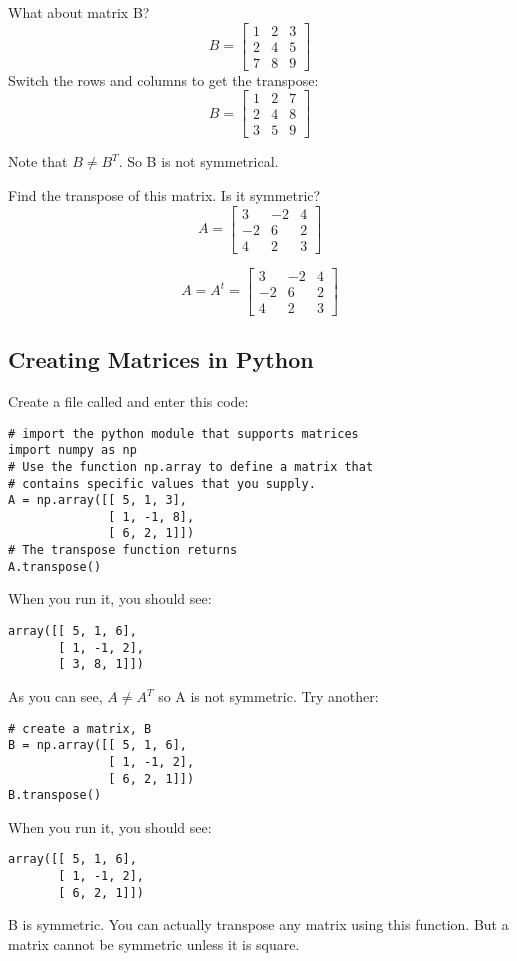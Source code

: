 What about matrix B? 
$$
B = \begin{bmatrix}
1 & 2 & 3 \\
2 & 4 & 5 \\
7 & 8 & 9
\end{bmatrix}
$$
Switch the rows and columns to get the transpose:
$$
B = \begin{bmatrix}
1 & 2 & 7 \\
2 & 4 & 8 \\
3 & 5 & 9
\end{bmatrix}
$$

Note that $B \neq B^T$. So B is not symmetrical.

\begin{Exercise}[title={Matrix Transposition}, label=matrix-transpose01]
Find the transpose of this matrix. Is it symmetric? 
$$A = \begin{bmatrix}
 		3 & -2 &4  \\
 		-2 & 6 &2 \\
 		4 & 2 & 3 
	  \end{bmatrix}$$
\end{Exercise}
\begin{Answer}[ref=matrix-transpose01]
$$A =  A^t = 
	  \begin{bmatrix}
 		3 & -2 & 4  \\
 		-2 & 6 & 2 \\
 		4 & 2 & 3 
	\end{bmatrix}$$
\end{Answer}

\subsection{Creating Matrices in Python}
Create a file called  and enter this code:
\begin{Verbatim}
# import the python module that supports matrices
import numpy as np
# Use the function np.array to define a matrix that 
# contains specific values that you supply.
A = np.array([[ 5, 1, 3], 
              [ 1, -1, 8], 
              [ 6, 2, 1]])
# The transpose function returns 
A.transpose()
\end{Verbatim}
When you run it, you should see:
\begin{Verbatim}
array([[ 5, 1, 6], 
       [ 1, -1, 2], 
       [ 3, 8, 1]])
\end{Verbatim}
As you can see, $A\neq A^T$ so A is not symmetric.
Try another: 
\begin{Verbatim}
# create a matrix, B
B = np.array([[ 5, 1, 6], 
              [ 1, -1, 2], 
              [ 6, 2, 1]])
B.transpose()
\end{Verbatim}
When you run it, you should see:
\begin{Verbatim}
array([[ 5, 1, 6], 
       [ 1, -1, 2], 
       [ 6, 2, 1]])
\end{Verbatim}
B is symmetric. You can actually transpose any matrix using this function. But a matrix cannot be symmetric unless it is square. 

